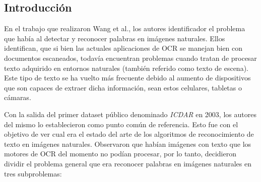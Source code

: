 \subsection{Introducción}

	En el trabajo que realizaron Wang et al., los autores identificador el problema que había al detectar y reconocer palabras en imágenes naturales. Ellos identifican, que si bien las actuales aplicaciones de OCR se manejan bien con documentos escaneados, todavía encuentran problemas cuando tratan de procesar texto adquirido en entornos naturales (también referido como texto de escena). Este tipo de texto se ha vuelto más frecuente debido al aumento de dispositivos que son capaces de extraer dicha información, sean estos celulares, tabletas o cámaras.
	
	Con la salida del primer dataset público denominado \textit{ICDAR} en 2003, los autores del mismo lo establecieron como punto común de referencia. Esto fue con el objetivo de ver cual era el estado del arte de los algoritmos de reconocimiento de texto en imágenes naturales. Observaron que habían imágenes con texto que los motores de OCR del momento no podían procesar, por lo tanto, decidieron dividir el problema general que era reconocer palabras en imágenes naturales en tres subproblemas:
	
